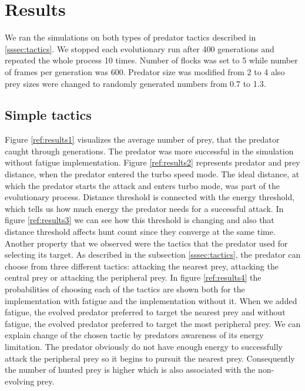\documentclass[internal]{FRIreport}
\begin{document}

\section {Results}
We ran the simulations on both types of predator tactics described in \ref{sssec:tactics}. We stopped each evolutionary run after 400 generations and repeated the whole process 10 times. Number of flocks was set to 5 while number of frames per generation was 600. Predator size was modified from 2 to 4 also prey sizes were changed to randomly generated numbers from 0.7 to 1.3.  
\subsection{Simple tactics}
Figure \ref{ref:results1} visualizes the average number of prey, that the predator caught through generations. The predator was more successful in the simulation without fatigue implementation. Figure \ref{ref:results2} represents predator and prey distance, when the predator entered the turbo speed mode. The ideal distance, at which the predator starts the attack and enters turbo mode, was part of the evolutionary process. Distance threshold is connected with the energy threshold, which tells us how much energy the predator needs for a successful attack. In figure \ref{ref:results3} we can see how this threshold is changing and also that distance threshold affects hunt count since they converge at the same time.\\
Another property that we observed were the tactics that the predator used for selecting its target. As described in the subsection \ref{sssec:tactics}, the predator can choose from three different tactics: attacking the nearest prey, attacking the central prey or attacking the peripheral prey. In figure \ref{ref:results4} the probabilities of choosing each of the tactics are shown both for the implementation with fatigue and the implementation without it.  When we added fatigue, the evolved predator preferred to target the nearest prey and without fatigue, the evolved predator preferred to target the most peripheral prey. We can explain change of the chosen tactic by predators awareness of its energy limitation. The predator obviously do not have enough energy to successfully attack the peripheral prey so it begins to pursuit the nearest prey. Consequently the number of hunted prey is higher which is also associated with the non-evolving prey. 
 
\end{document}
